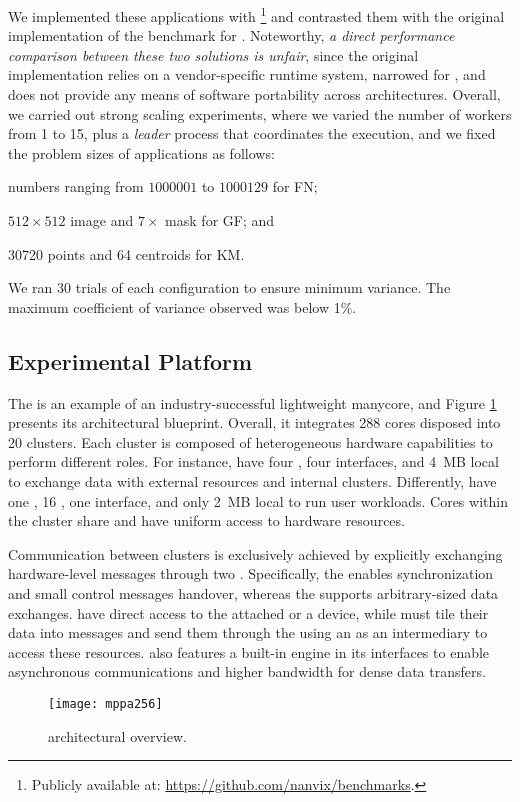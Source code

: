 	We implemented these applications with \mpi\footnote{Publicly
	available at: \url{https://github.com/nanvix/benchmarks}.} and
	contrasted them with the original implementation of the benchmark for
	\mppa. Noteworthy, \textit{a direct performance comparison between these two
	solutions is unfair}, since the original implementation relies on
	a vendor-specific runtime system, narrowed for
	\mppa, and does not provide any means of software portability across
	architectures.
	Overall, we carried out strong scaling experiments, where we varied
	the number of workers from 1 to 15, plus a \textit{leader} process that
	coordinates the execution, and we fixed the problem sizes
	of applications as follows:
	\begin{enumerate*}[label=(\roman*)]
		\item numbers ranging from $1000001$ to $1000129$ for FN;
		\item $512\times512$ image and $7\times$ mask for GF; and
		\item 30720 points and 64 centroids for KM.
	\end{enumerate*}
	We ran 30 trials of each configuration to ensure minimum variance.
	The maximum coefficient of variance observed was below 1\%.

	\subsection{Experimental Platform}

	The \mppa is an example of an industry-successful lightweight
	manycore, and Figure \ref{figure:lightweight-manycore} presents its
	architectural blueprint.
	Overall, it integrates 288 cores disposed into 20
	clusters. Each cluster is composed of heterogeneous
	hardware capabilities to perform different roles. For instance,
	\ioclusters have four \rmans, four \noc interfaces, and 4~MB local
	\sram to exchange data with external resources and internal clusters.
	Differently, \cclusters have one \rman, 16 \pes, one \noc interface,
	and only 2~MB local \sram to run user workloads. Cores within the
	cluster share and have uniform access to hardware resources.

	Communication between clusters is exclusively achieved by explicitly
	exchanging hardware-level messages through two \nocs. Specifically,
	the \cnoc enables synchronization and small control messages handover,
	whereas the \dnoc supports arbitrary-sized data exchanges.
	\ioclusters have direct access to the attached \dram or a device,
	while \cclusters must tile their data into messages and send them
	through the \noc using an \iocluster as an intermediary to access
	these resources. \mppa also features
	a built-in \dma engine in its \noc interfaces to enable asynchronous
	communications and higher bandwidth for dense data transfers.

	\begin{figure}[t]
		\centering
		\texttt{[image: mppa256]}
		\caption{\mppa architectural overview.}
		\label{figure:lightweight-manycore}
		\vspace{-15pt}
	\end{figure}
